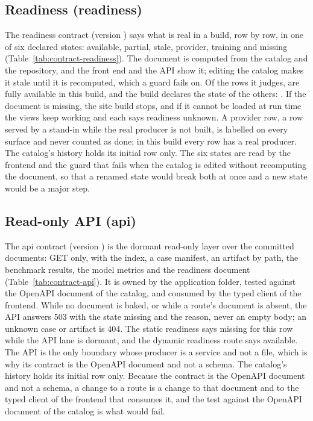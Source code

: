 

\subsection{Readiness (readiness)}\label{sec:data-readiness}

The readiness contract (version ) says what is real in a build, row by row, in one of six declared states: available, partial, stale, provider, training and missing (Table~\ref{tab:contract-readiness}). The document is computed from the catalog and the repository, and the front end and the API show it; editing the catalog makes it stale until it is recomputed, which a guard fails on. Of the \nContracts{} rows it judges, \nContractsAvailable{} are fully available in this build, and the build declares the state of the others: \readinessOthers. If the document is missing, the site build stops, and if it cannot be loaded at run time the views keep working and each says readiness unknown. A provider row, a row served by a stand-in while the real producer is not built, is labelled on every surface and never counted as done; in this build every row has a real producer. The catalog's history holds its initial row only. The six states are read by the frontend and the guard that fails when the catalog is edited without recomputing the document, so that a renamed state would break both at once and a new state would be a major step.



\subsection{Read-only API (api)}\label{sec:data-api}

The api contract (version ) is the dormant read-only layer over the committed documents: GET only, with the index, a case manifest, an artifact by path, the benchmark results, the model metrics and the readiness document (Table~\ref{tab:contract-api}). It is owned by the application folder, tested against the OpenAPI document of the catalog, and consumed by the typed client of the frontend. While no document is baked, or while a route's document is absent, the API answers 503 with the state missing and the reason, never an empty body; an unknown case or artifact is 404. The static readiness says missing for this row while the API lane is dormant, and the dynamic readiness route says available. The API is the only boundary whose producer is a service and not a file, which is why its contract is the OpenAPI document and not a schema. The catalog's history holds its initial row only. Because the contract is the OpenAPI document and not a schema, a change to a route is a change to that document and to the typed client of the frontend that consumes it, and the test against the OpenAPI document of the catalog is what would fail.


